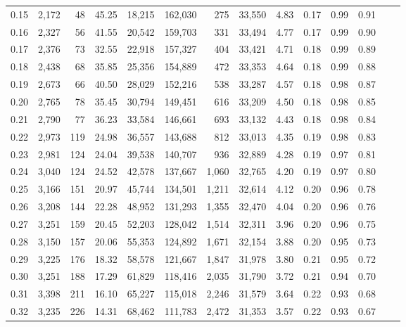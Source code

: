 \begin{tabular}{rrrrrrrrrrrrrr}
0.15 &  2,172 &   48 &   45.25 &   18,215 &  162,030 &     275 &  33,550 &  4.83 &  0.17 &  0.99 &      0.91 \\
0.16 &  2,327 &   56 &   41.55 &   20,542 &  159,703 &     331 &  33,494 &  4.77 &  0.17 &  0.99 &      0.90 \\
0.17 &  2,376 &   73 &   32.55 &   22,918 &  157,327 &     404 &  33,421 &  4.71 &  0.18 &  0.99 &      0.89 \\
0.18 &  2,438 &   68 &   35.85 &   25,356 &  154,889 &     472 &  33,353 &  4.64 &  0.18 &  0.99 &      0.88 \\
0.19 &  2,673 &   66 &   40.50 &   28,029 &  152,216 &     538 &  33,287 &  4.57 &  0.18 &  0.98 &      0.87 \\
0.20 &  2,765 &   78 &   35.45 &   30,794 &  149,451 &     616 &  33,209 &  4.50 &  0.18 &  0.98 &      0.85 \\
0.21 &  2,790 &   77 &   36.23 &   33,584 &  146,661 &     693 &  33,132 &  4.43 &  0.18 &  0.98 &      0.84 \\
0.22 &  2,973 &  119 &   24.98 &   36,557 &  143,688 &     812 &  33,013 &  4.35 &  0.19 &  0.98 &      0.83 \\
0.23 &  2,981 &  124 &   24.04 &   39,538 &  140,707 &     936 &  32,889 &  4.28 &  0.19 &  0.97 &      0.81 \\
0.24 &  3,040 &  124 &   24.52 &   42,578 &  137,667 &   1,060 &  32,765 &  4.20 &  0.19 &  0.97 &      0.80 \\
0.25 &  3,166 &  151 &   20.97 &   45,744 &  134,501 &   1,211 &  32,614 &  4.12 &  0.20 &  0.96 &      0.78 \\
0.26 &  3,208 &  144 &   22.28 &   48,952 &  131,293 &   1,355 &  32,470 &  4.04 &  0.20 &  0.96 &      0.76 \\
0.27 &  3,251 &  159 &   20.45 &   52,203 &  128,042 &   1,514 &  32,311 &  3.96 &  0.20 &  0.96 &      0.75 \\
0.28 &  3,150 &  157 &   20.06 &   55,353 &  124,892 &   1,671 &  32,154 &  3.88 &  0.20 &  0.95 &      0.73 \\
0.29 &  3,225 &  176 &   18.32 &   58,578 &  121,667 &   1,847 &  31,978 &  3.80 &  0.21 &  0.95 &      0.72 \\
0.30 &  3,251 &  188 &   17.29 &   61,829 &  118,416 &   2,035 &  31,790 &  3.72 &  0.21 &  0.94 &      0.70 \\
0.31 &  3,398 &  211 &   16.10 &   65,227 &  115,018 &   2,246 &  31,579 &  3.64 &  0.22 &  0.93 &      0.68 \\
0.32 &  3,235 &  226 &   14.31 &   68,462 &  111,783 &   2,472 &  31,353 &  3.57 &  0.22 &  0.93 &      0.67 \\

\end{tabular}
